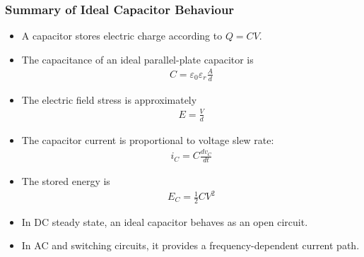\begin{frame}
\frametitle{Summary of Ideal Capacitor Behaviour}
\begin{itemize}
    \item A capacitor stores electric charge according to $Q=CV$.
    \item The capacitance of an ideal parallel-plate capacitor is
    \begin{align}
        C=\varepsilon_0\varepsilon_r\frac{A}{d}
    \end{align}
    \item The electric field stress is approximately
    \begin{align}
        E=\frac{V}{d}
    \end{align}
    \item The capacitor current is proportional to voltage slew rate:
    \begin{align}
        i_C=C\frac{dv_C}{dt}
    \end{align}
    \item The stored energy is
    \begin{align}
        E_C=\frac{1}{2}CV^2
    \end{align}
    \item In DC steady state, an ideal capacitor behaves as an open circuit.
    \item In AC and switching circuits, it provides a frequency-dependent current path.
\end{itemize}
\end{frame}


